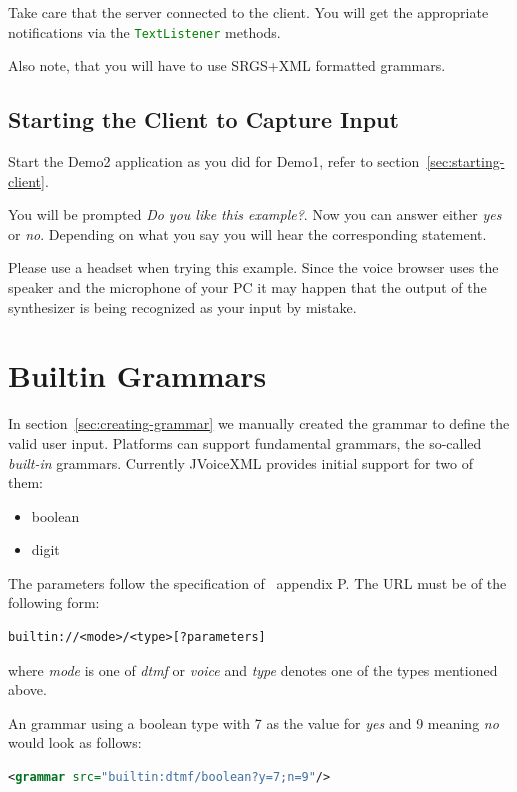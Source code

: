\documentclass[11pt,a4paper]{book}
\begin{document}
Take care that the server connected to the client. You will get the
appropriate notifications via the \lstinline[language=java]{TextListener}
methods.

Also note, that you will have to use SRGS+XML formatted grammars.

\subsection{Starting the Client to Capture Input}
\label{sec:starting-the-client}

Start the Demo2 application as you did for Demo1, refer to
section~\ref{sec:starting-client}.

You will be prompted \emph{Do you like this example?}. Now you can answer
either \emph{yes} or \emph{no}. Depending on what you say you will hear the
corresponding statement.

Please use a headset when trying this example. Since the voice browser uses the
speaker and the microphone of your PC it may happen that the output of the
synthesizer is being recognized as your input by mistake.

\section{Builtin Grammars}

In section~\ref{sec:creating-grammar} we manually created the grammar to
define the valid user input. Platforms can support fundamental grammars, the
so-called \emph{built-in} grammars. Currently JVoiceXML provides initial support
for two of them:
\begin{itemize}
  \item boolean
  \item digit
\end{itemize}

The parameters follow the specification of~\cite{w3.org:voicexml} appendix P.
The URL must be of the following form:

\begin{lstlisting}
builtin://<mode>/<type>[?parameters]
\end{lstlisting}

where \emph{mode} is one of \emph{dtmf} or \emph{voice} and \emph{type} denotes
one of the types mentioned above.

An grammar using a boolean type with 7 as the value for \emph{yes} and 9
meaning \emph{no} would look as follows:

\begin{lstlisting}[language=XML]
<grammar src="builtin:dtmf/boolean?y=7;n=9"/>
\end{lstlisting}
\end{document}
